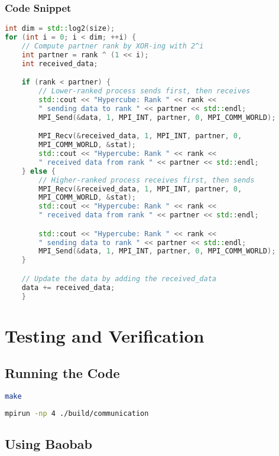 \documentclass[11pt]{article}
\begin{document}
\subsubsection{Code Snippet}
\begin{lstlisting}[language=C++, caption=Key part of Hypercube]
int dim = std::log2(size);
for (int i = 0; i < dim; ++i) {
    // Compute partner rank by XOR-ing with 2^i
    int partner = rank ^ (1 << i);  
    int received_data;

    if (rank < partner) {
        // Lower-ranked process sends first, then receives
        std::cout << "Hypercube: Rank " << rank << 
        " sending data to rank " << partner << std::endl;
        MPI_Send(&data, 1, MPI_INT, partner, 0, MPI_COMM_WORLD);

        MPI_Recv(&received_data, 1, MPI_INT, partner, 0, 
        MPI_COMM_WORLD, &stat);
        std::cout << "Hypercube: Rank " << rank << 
        " received data from rank " << partner << std::endl;
    } else {
        // Higher-ranked process receives first, then sends
        MPI_Recv(&received_data, 1, MPI_INT, partner, 0, 
        MPI_COMM_WORLD, &stat);
        std::cout << "Hypercube: Rank " << rank << 
        " received data from rank " << partner << std::endl;

        std::cout << "Hypercube: Rank " << rank << 
        " sending data to rank " << partner << std::endl;
        MPI_Send(&data, 1, MPI_INT, partner, 0, MPI_COMM_WORLD);
    }

    // Update the data by adding the received_data
    data += received_data; 
    }
\end{lstlisting}

\section{Testing and Verification}
\subsection{Running the Code}

\begin{lstlisting}[language=bash,caption=Compiling the code]
make 
\end{lstlisting}

\begin{lstlisting}[language=bash,caption=Running the code]
mpirun -np 4 ./build/communication
\end{lstlisting}

\subsection{Using Baobab}
\end{document}
